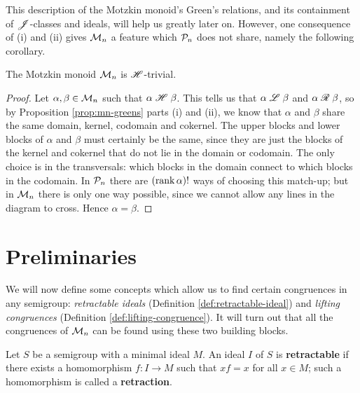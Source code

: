 This description of the Motzkin monoid's Green's relations, and its containment
of $\mathrel{\mathscr{J}}$-classes and ideals, will help us greatly later on.  However, one
consequence of (i) and (ii) gives $\mathcal{M}_n$ a feature which $\mathcal{P}_n$ does not
share, namely the following corollary.

\begin{corollary}
  \label{cor:mn-h-trivial}
  The Motzkin monoid $\mathcal{M}_n$ is $\mathrel{\mathscr{H}}$-trivial.
  \begin{proof}
    Let $\alpha, \beta \in \mathcal{M}_n$ such that $\alpha \mathrel{\mathscr{H}} \beta$.  This tells us
    that $\alpha \mathrel{\mathscr{L}} \beta$ and $\alpha \mathrel{\mathscr{R}} \beta$, so by Proposition
    \ref{prop:mn-greens} parts (i) and (ii), we know that $\alpha$ and $\beta$
    share the same domain, kernel, codomain and cokernel.  The upper blocks and
    lower blocks of $\alpha$ and $\beta$ must certainly be the same, since they
    are just the blocks of the kernel and cokernel that do not lie in the domain
    or codomain.  The only choice is in the transversals: which blocks in the
    domain connect to which blocks in the codomain.  In $\mathcal{P}_n$ there are
    $(\operatorname{rank} \alpha)!$ ways of choosing this match-up; but in $\mathcal{M}_n$ there is
    only one way possible, since we cannot allow any lines in the diagram to
    cross.  Hence $\alpha = \beta$.
  \end{proof}
\end{corollary}


\section{Preliminaries}
\label{sec:motzkin-prelim}
We will now define some concepts which allow us to find certain
congruences in any semigroup: \textit{retractable ideals} (Definition
\ref{def:retractable-ideal}) and \textit{lifting congruences} (Definition
\ref{def:lifting-congruence}).  It will turn out that all the congruences of
$\mathcal{M}_n$ can be found using these two building blocks.

\begin{definition}
  \label{def:retractable-ideal}
   
  Let $S$ be a semigroup with a minimal ideal $M$.  An ideal $I$ of $S$ is
  \textbf{retractable} if there exists a homomorphism $f: I \to M$ such that
  $xf = x$ for all $x \in M$; such a homomorphism is called a
  \textbf{retraction}.
\end{definition}

